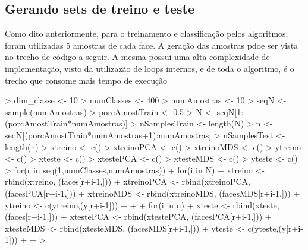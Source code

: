 \documentclass[12pt,a4paper,titlepage]{article}
\begin{document}
\subsection{Gerando sets de treino e teste}

Como dito anteriormente, para o treinamento e classificação pelos algoritmos, foram utilizadas 5 amostras de cada face. A geração das amostras pdoe ser vista no trecho de código a seguir. A mesma possui uma alta complexidade de implementação, visto da utilizazão de loops internos, e de toda o algoritmo, é o trecho que consome mais tempo de execução

\begin{Schunk}
\begin{Sinput}
> dim_classe <- 10
> numClasses <- 400
> numAmostras <- 10
> seqN <- sample(numAmostras)
> porcAmostTrain <- 0.5
> N <- seqN[1:(porcAmostTrain*numAmostras)]
> nSamplesTrain <- length(N)
> n <- seqN[(porcAmostTrain*numAmostras+1):numAmostras]
> nSamplesTest <- length(n)
> xtreino <- c()
> xtreinoPCA <- c()
> xtreinoMDS <- c()
> ytreino <- c()
> xteste <- c()
> xtestePCA <- c()
> xtesteMDS <- c()
> yteste <- c()
> for(r in seq(1,numClasses,numAmostras)) {
+     for(i in N) {
+         xtreino <- rbind(xtreino, (faces[r+i-1,]))
+         xtreinoPCA <- rbind(xtreinoPCA, (facesPCA[r+i-1,]))
+         xtreinoMDS <- rbind(xtreinoMDS, (facesMDS[r+i-1,]))
+         ytreino <- c(ytreino,(y[r+i-1]))
+     }
+     
+     for(i in n) {
+         xteste <- rbind(xteste, (faces[r+i-1,]))
+         xtestePCA <- rbind(xtestePCA, (facesPCA[r+i-1,]))
+         xtesteMDS <- rbind(xtesteMDS, (facesMDS[r+i-1,]))
+         yteste <- c(yteste,(y[r+i-1]))
+     }
+ }
> 
\end{Sinput}
\end{Schunk}
\end{document}
